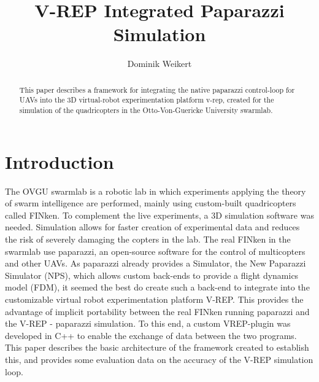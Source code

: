 \documentclass[journal]{IEEEtran}
\begin{document}
\title{V-REP Integrated Paparazzi Simulation\\}


\author{Dominik Weikert}%


\maketitle


\begin{abstract}
This paper describes a framework for integrating the native paparazzi control-loop for UAVs into the 3D virtual-robot experimentation platform v-rep, created for the simulation of the quadricopters in the Otto-Von-Guericke University swarmlab. 
\end{abstract}







%
\IEEEpeerreviewmaketitle



\section{Introduction}

The OVGU swarmlab is a robotic lab in which experiments applying the theory of swarm intelligence are performed, mainly using custom-built quadricopters called FINken. To complement the live experiments, a 3D simulation software was needed. Simulation allows for faster creation of experimental data and reduces the risk of severely damaging the copters in the lab. The real FINken in the swarmlab use paparazzi, an open-source software for the control of multicopters and other UAVs. As paparazzi already provides a Simulator, the New Paparazzi Simulator (NPS), which allows custom back-ends to provide a flight dynamics model (FDM), it seemed the best do create such a back-end to integrate into the customizable virtual robot experimentation platform V-REP. This provides the advantage of implicit portability between the real FINken running paparazzi and the V-REP - paparazzi simulation.
To this end, a custom VREP-plugin was developed in C++ to enable the exchange of data between the two programs.
This paper describes the basic architecture of the framework created to establish this, and provides some evaluation data on the accuracy of the V-REP simulation loop.
\end{document}
